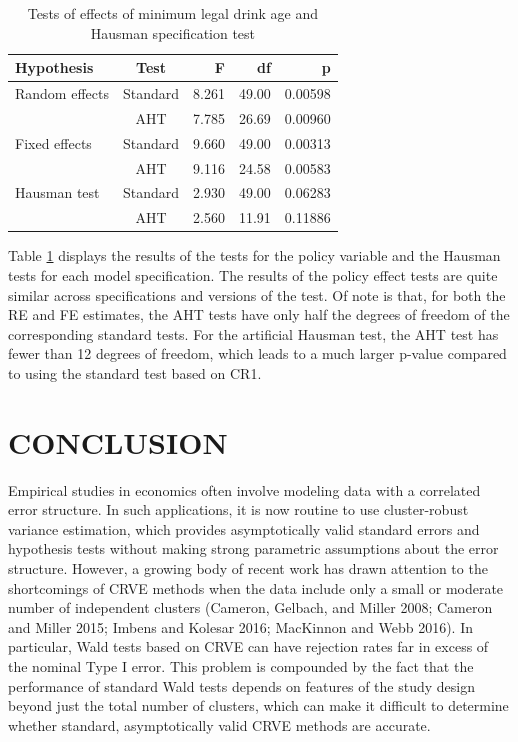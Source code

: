 \documentclass[12pt]{article}
\begin{document}
\begin{table}[bth]
\centering
\caption{Tests of effects of minimum legal drink age and Hausman specification test} 
\label{tab:MLDA}
\begin{tabular}{lcrrr}
  \toprule
Hypothesis & Test & F & df & p \\ 
  \midrule
Random effects & Standard & 8.261 & 49.00 & 0.00598 \\ 
   & AHT & 7.785 & 26.69 & 0.00960 \\ 
  Fixed effects & Standard & 9.660 & 49.00 & 0.00313 \\ 
   & AHT & 9.116 & 24.58 & 0.00583 \\ 
   \midrule
Hausman test & Standard & 2.930 & 49.00 & 0.06283 \\ 
   & AHT & 2.560 & 11.91 & 0.11886 \\ 
   \bottomrule
\end{tabular}
\end{table}

Table \ref{tab:MLDA} displays the results of the tests for the policy
variable and the Hausman tests for each model specification. The results
of the policy effect tests are quite similar across specifications and
versions of the test. Of note is that, for both the RE and FE estimates,
the AHT tests have only half the degrees of freedom of the corresponding
standard tests. For the artificial Hausman test, the AHT test has fewer
than 12 degrees of freedom, which leads to a much larger p-value
compared to using the standard test based on CR1.

\hypertarget{sec:conclusion}{%
\section{CONCLUSION}\label{sec:conclusion}}

Empirical studies in economics often involve modeling data with a
correlated error structure. In such applications, it is now routine to
use cluster-robust variance estimation, which provides asymptotically
valid standard errors and hypothesis tests without making strong
parametric assumptions about the error structure. However, a growing
body of recent work has drawn attention to the shortcomings of CRVE
methods when the data include only a small or moderate number of
independent clusters (Cameron, Gelbach, and Miller 2008; Cameron and
Miller 2015; Imbens and Kolesar 2016; MacKinnon and Webb 2016). In
particular, Wald tests based on CRVE can have rejection rates far in
excess of the nominal Type I error. This problem is compounded by the
fact that the performance of standard Wald tests depends on features of
the study design beyond just the total number of clusters, which can
make it difficult to determine whether standard, asymptotically valid
CRVE methods are accurate.
\end{document}

